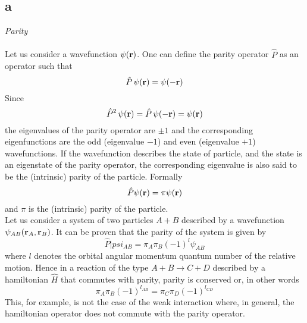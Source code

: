 \subsection*{a} 

\vspace{10pt}
\emph{Parity} \\
\vspace{10pt} \\
Let us consider a wavefunction $\psi(\mathbf{r})$. One can define the parity operator $\hat P$ as an operator such that 
\begin{equation*}
    \hat P \, \psi(\mathbf{r}) = \psi(-\mathbf{r})
\end{equation*}
Since
\begin{equation}
    \hat P^2 \, \psi(\mathbf{r}) = \hat P \, \psi(-\mathbf{r}) = \psi(\mathbf{r})
    \label{eq:eigenvalue_equation_parity}
\end{equation}
the eigenvalues of the parity operator are $\pm 1$ and the corresponding eigenfunctions are the odd (eigenvalue $-1$) and even (eigenvalue $+1$) wavefunctions. If the wavefunction
describes the state of particle, and the state is an eigenstate of the parity operator, the corresponding eigenvalue is also said to be the (intrinsic) parity of the particle. Formally
\begin{equation*}
    \hat P \psi(\mathbf{r}) = \pi \psi(\mathbf{r})
\end{equation*}
and $\pi$ is the (intrinsic) parity of the particle. \\
Let us consider a system of two particles $A+B$ described by a wavefunction $\psi_{AB}(\mathbf{r}_A, \mathbf{r}_B)$. It can be proven that the parity of the system is given by 
\begin{equation*}
    \hat P |psi_{AB} = \pi_A \pi_B (-1)^l \psi_{AB}
\end{equation*}
where $l$ denotes the orbital angular momentum quantum number of the relative motion. Hence in a reaction of the type $A+B \rightarrow C+D$ described by a hamiltonian $\hat H$ that commutes with parity,
parity is conserved or, in other words
\begin{equation*}
    \pi_A \pi_B (-1)^{l_{AB}} = \pi_C \pi_D (-1)^{l_{CD}} 
\end{equation*}
This, for example, is not the case of the weak interaction where, in general, the hamiltonian operator does not commute with the parity operator. \\
\vspace{10pt} \\

